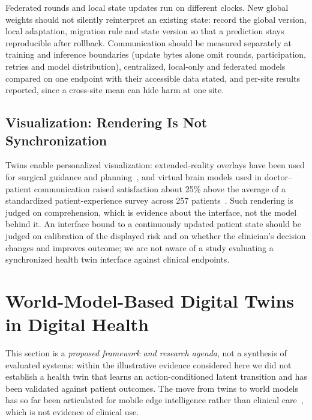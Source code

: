 \documentclass[journal]{IEEEtran}
\begin{document}
Federated rounds and local state updates run on different clocks. New global weights should not silently reinterpret an existing state: record the global version, local adaptation, migration rule and state version so that a prediction stays reproducible after rollback. Communication should be measured separately at training and inference boundaries (update bytes alone omit rounds, participation, retries and model distribution), centralized, local-only and federated models compared on one endpoint with their accessible data stated, and per-site results reported, since a cross-site mean can hide harm at one site.

\subsection{Visualization: Rendering Is Not Synchronization}
Twins enable personalized visualization: extended-reality overlays have been used for surgical guidance and planning~\cite{Auvinet2018AR}, and virtual brain models used in doctor--patient communication raised satisfaction about 25\% above the average of a standardized patient-experience survey across 257 patients~\cite{Louis2021VR}. Such rendering is judged on comprehension, which is evidence about the interface, not the model behind it. An interface bound to a continuously updated patient state should be judged on calibration of the displayed risk and on whether the clinician's decision changes and improves outcome; we are not aware of a study evaluating a synchronized health twin interface against clinical endpoints.

\section{World-Model-Based Digital Twins in Digital Health}
\label{sec:world_model_dt}
This section is a \emph{proposed framework and research agenda}, not a synthesis of evaluated systems: within the illustrative evidence considered here we did not establish a health twin that learns an action-conditioned latent transition and has been validated against patient outcomes. The move from twins to world models has so far been articulated for mobile edge intelligence rather than clinical care~\cite{Zheng2026DTtoWM}, which is not evidence of clinical use.
\end{document}
